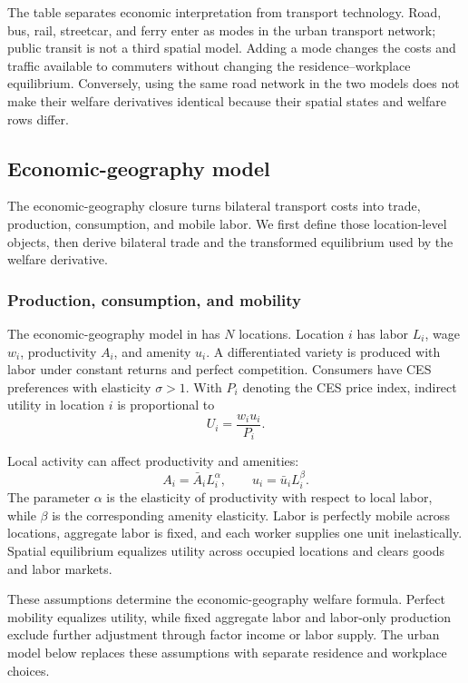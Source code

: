 The table separates economic interpretation from transport technology.
Road, bus, rail, streetcar, and ferry enter as modes in the urban transport
network; public transit is not a third spatial model. Adding a mode changes the
costs and traffic available to commuters without changing the
residence--workplace equilibrium. Conversely, using the same road network in
the two models does not make their welfare derivatives identical because their
spatial states and welfare rows differ.

\subsection{Economic-geography model}

The economic-geography closure turns bilateral transport costs into trade,
production, consumption, and mobile labor. We first define those location-level
objects, then derive bilateral trade and the transformed equilibrium used by
the welfare derivative.

\subsubsection{Production, consumption, and mobility}

The economic-geography model in \citet{AllenFuchsWong2026} has \(N\)
locations. Location \(i\) has labor \(L_i\), wage \(w_i\), productivity
\(A_i\), and amenity \(u_i\). A differentiated variety is produced with labor
under constant returns and perfect competition. Consumers have CES preferences
with elasticity \(\sigma>1\). With \(P_i\) denoting the CES price index,
indirect utility in location \(i\) is proportional to
\[
  U_i=\frac{w_i u_i}{P_i}.
\]

Local activity can affect productivity and amenities:
\[
  A_i=\bar A_i L_i^\alpha,
  \qquad
  u_i=\bar u_i L_i^\beta.
\]
The parameter \(\alpha\) is the elasticity of productivity with respect to
local labor, while \(\beta\) is the corresponding amenity elasticity. Labor is
perfectly mobile across
locations, aggregate labor is fixed, and each worker supplies one unit
inelastically. Spatial equilibrium equalizes utility across occupied
locations and clears goods and labor markets.

These assumptions determine the economic-geography welfare formula. Perfect
mobility equalizes utility, while fixed aggregate labor and labor-only
production exclude further adjustment through factor income or labor supply.
The urban model below replaces these assumptions with separate residence and
workplace choices.

